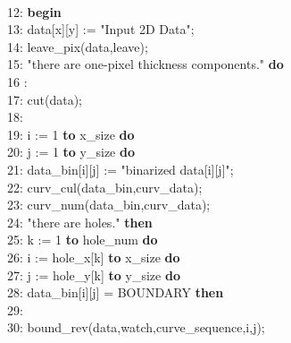 \documentclass[a4paper,10pt]{jarticle}
\begin{document}
\\
12: {\bfseries begin}\\
13: \hspace{0.5cm}data[x][y] := "Input 2D Data";\\
14: \hspace{0.5cm}leave\_pix(data,leave);\\
15: \hspace{0.5cm}{\bfseries while} "there are one-pixel thickness components." {\bfseries do}\\
16 :\hspace{1cm}{\bfseries begin}\\
17: \hspace{1.5cm}cut(data);\\
18: \hspace{1cm}{\bfseries end;}\\
19: \hspace{0.5cm}{\bfseries for} i := 1 {\bfseries to} x\_size {\bfseries do}\\
20: \hspace{1cm}{\bfseries for} j := 1 {\bfseries to} y\_size {\bfseries do}\\
21: \hspace{1.5cm}data\_bin[i][j] := "binarized data[i][j]";\\
22: \hspace{0.5cm}curv\_cul(data\_bin,curv\_data);\\
23: \hspace{0.5cm}curv\_num(data\_bin,curv\_data);\\
24: \hspace{0.5cm}{\bfseries if} "there are holes." {\bfseries then}\\
25: \hspace{1cm}{\bfseries for} k := 1 {\bfseries to} hole\_num {\bfseries do}\\
26: \hspace{1.5cm}{\bfseries for} i := hole\_x[k] {\bfseries to} x\_size {\bfseries do}\\
27: \hspace{2cm}{\bfseries for} j := hole\_y[k] {\bfseries to} y\_size {\bfseries do}\\
28: \hspace{2.5cm}{\bfseries if} data\_bin[i][j] = BOUNDARY {\bfseries then}\\
29: \hspace{3cm}{\bfseries begin}\\
30: \hspace{3.5cm}bound\_rev(data,watch,curve\_sequence,i,j);\\
\end{document}
